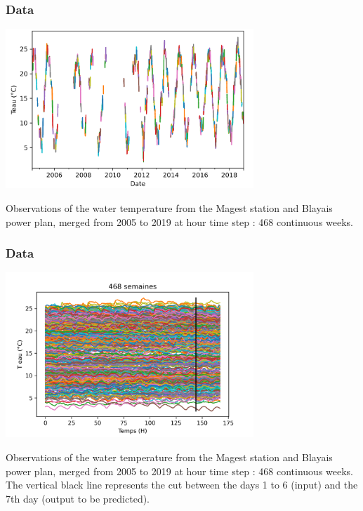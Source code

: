 \documentclass[10pt]{beamer}
\begin{document}
\begin{frame}
\frametitle{Data}

\begin{center}
\includegraphics[width=0.7\textwidth]{figures/Teau-semaines-continues.png}
\end{center}

Observations of the water temperature from the Magest station and Blayais 
power plan, merged from 2005 to 2019 at hour time step : 468 continuous 
weeks. 

\end{frame}


\begin{frame}
\frametitle{Data}

\begin{center}
\includegraphics[width=0.7\textwidth]{figures/Teau-semaines.png}
\end{center}

Observations of the water temperature from the Magest station and Blayais 
power plan, merged from 2005 to 2019 at hour time step : 468 continuous 
weeks. 
The vertical black line represents the cut between the days 1 to 6 (input) and 
the 7th day (output to be predicted).

\end{frame}
\end{document}
